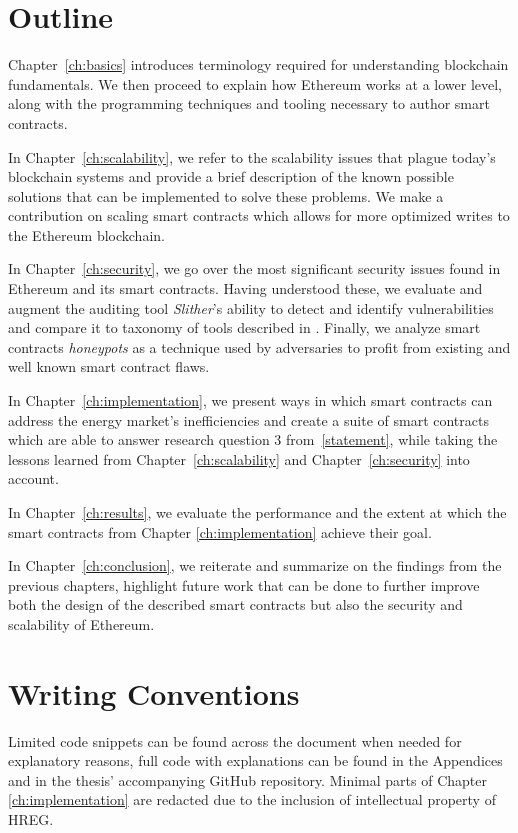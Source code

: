 \section{Outline}

Chapter~\ref{ch:basics} introduces terminology required for understanding blockchain fundamentals. We then proceed to explain how Ethereum works at a lower level, along with the programming techniques and tooling necessary to author smart contracts.

In Chapter~\ref{ch:scalability}, we refer to the scalability issues that plague today's blockchain systems and provide a brief description of the known possible solutions that can be implemented to solve these problems. We make a contribution on scaling smart contracts which allows for more optimized writes to the Ethereum blockchain.

In Chapter~\ref{ch:security}, we go over the most significant security issues found in Ethereum and its smart contracts. Having understood these, we evaluate and augment the auditing tool \textit{Slither}'s ability to detect and identify vulnerabilities and compare it to taxonomy of tools described in \cite{tools}. Finally, we analyze smart contracts \textit{honeypots} as a technique used by adversaries to profit from existing and well known smart contract flaws.

In Chapter~\ref{ch:implementation}, we present ways in which smart contracts can address the energy market's inefficiencies and create a suite of smart contracts which are able to answer research question 3 from~\ref{statement}, while taking the lessons learned from Chapter~\ref{ch:scalability} and Chapter~\ref{ch:security} into account.

In Chapter~\ref{ch:results}, we evaluate the performance and the extent at which the smart contracts from Chapter \ref{ch:implementation} achieve their goal. 

In Chapter~\ref{ch:conclusion}, we reiterate and summarize on the findings from the previous chapters, highlight future work that can be done to further improve both the design of the described smart contracts but also the security and scalability of Ethereum.

\section{Writing Conventions}
Limited code snippets can be found across the document when needed for explanatory reasons, full code with explanations can be found in the Appendices and in the thesis' accompanying GitHub repository\@. Minimal parts of Chapter \ref{ch:implementation} are redacted due to the inclusion of intellectual property of HREG.
